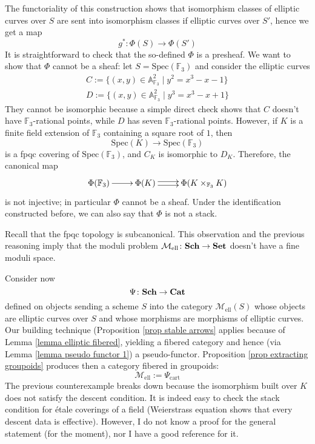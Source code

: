 \begin{refsection}
The functoriality of this construction shows that isomorphism classes of elliptic curves over $S$ are sent into isomorphism classes if elliptic curves over $S'$, hence we get a map
\[
g^* \colon \Phi(S) \to \Phi(S')
\]
It is straightforward to check that the so-defined $\Phi$ is a presheaf. We want to show that $\Phi$ cannot be a sheaf: let $S = \mathrm{Spec}(\mathbb F_3)$ and consider the elliptic curves
\begin{gather*}
C := \{(x,y) \in \mathbb A^2_{\mathbb F_3} \mid y^2 = x^3 - x - 1 \} \\
D := \{(x,y) \in \mathbb A^2_{\mathbb F_3} \mid y^3 = x^3 - x + 1 \}
\end{gather*}
They cannot be isomorphic because a simple direct check shows that $C$ doesn't have $\mathbb F_3$-rational points, while $D$ has seven $\mathbb F_3$-rational points. However, if $K$ is a finite field extension of $\mathbb F_3$ containing a square root of $1$, then
\[
\mathrm{Spec}(K) \to \mathrm{Spec}(\mathbb F_3)
\]
is a fpqc covering of $\mathrm{Spec}(\mathbb F_3)$, and $C_K$ is isomorphic to $D_K$. Therefore, the canonical map
\[
\xymatrix{
\Phi(\mathbb F_3) \ar[r] & \Phi(K) \ar@<.5ex>[r] \ar@<-.5ex>[r] & \Phi(K \times_{\mathbb F_3} K)
}
\]
is not injective; in particular $\Phi$ cannot be a sheaf. Under the identification constructed before, we can also say that $\Phi$ is not a stack.

\begin{rmk}
Recall that the fpqc topology is subcanonical. This observation and the previous reasoning imply that the moduli problem $\mathcal M_{\mathrm{ell}} \colon \mathbf{Sch} \to \mathbf{Set}$ doesn't have a fine moduli space.
\end{rmk}

Consider now
\[
\Psi \colon \mathbf{Sch} \to \mathbf{Cat}
\]
defined on objects sending a scheme $S$ into the category $\mathcal M_{\mathrm{ell}}(S)$ whose objects are elliptic curves over $S$ and whose morphisms are morphisms of elliptic curves. Our building technique (Proposition \ref{prop stable arrows} applies because of Lemma \ref{lemma elliptic fibered}, yielding a fibered category and hence (via Lemma \ref{lemma pseudo functor 1}) a pseudo-functor. Proposition \ref{prop extracting groupoids} produces then a category fibered in groupoids:
\[
\mathcal M_{\mathrm{ell}} := \Psi_{\mathrm{cart}}
\]
The previous counterexample breaks down because the isomorphism built over $K$ does not satisfy the descent condition. It is indeed easy to check the stack condition for étale coverings of a field (Weierstrass equation shows that every descent data is effective). However, I do not know a proof for the general statement (for the moment), nor I have a good reference for it.


\end{refsection}
